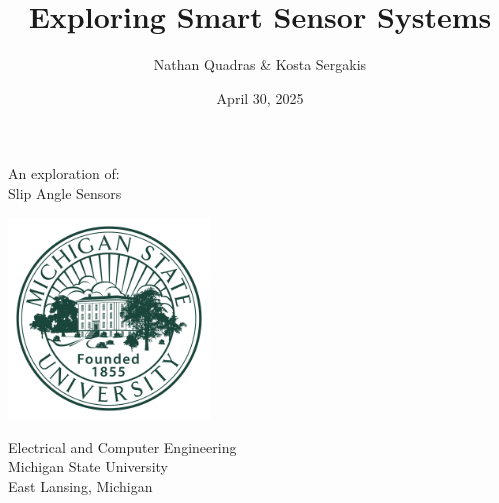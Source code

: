 \documentclass[12pt]{article}
\title{Exploring Smart Sensor Systems}
\author{Nathan Quadras \& Kosta Sergakis}
\date{April 30, 2025}
\makeatletter
\let\runauthor\@author
\let\runtitle\@title
\let\rundate\@date
\makeatother
\begin{document}
    
    \begin{titlepage}
        \begin{center}
            \vspace*{1.5cm}
            
            \textbf{\runtitle}
            
            \vspace{1cm}
            
            An exploration of:\\
            \vspace{0.25cm}
            Slip Angle Sensors
                
            \vspace{1cm}
            
            \textbf{\runauthor}
            
            \vfill  
            
            
            \vspace{1cm}

            \includegraphics[width=0.4\textwidth]{resources/michigan-state-logo-png-transparent.png}
                
            Electrical and Computer Engineering\\
            Michigan State University\\
            East Lansing, Michigan\\
            \rundate
                
        \end{center}
    
    \end{titlepage}

    \setcounter{secnumdepth}{0} %
    
\end{document}
